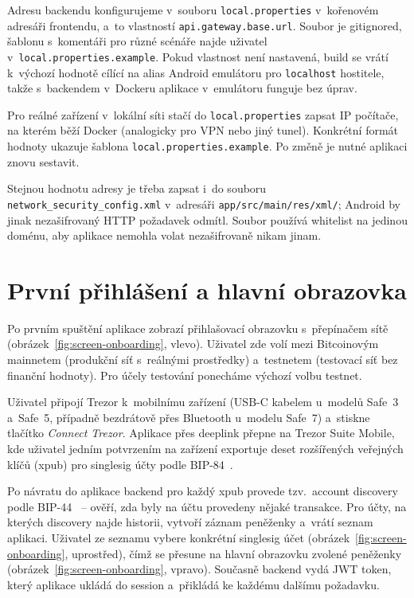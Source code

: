 Adresu backendu konfigurujeme v~souboru \texttt{local.properties}
v~kořenovém adresáři frontendu, a~to vlastností
\texttt{api.\allowbreak gateway.\allowbreak base.\allowbreak url}. Soubor je
gitignored, šablonu s~komentáři pro různé scénáře najde uživatel
v~\texttt{local.\allowbreak properties.\allowbreak example}. Pokud vlastnost
není nastavená, build se vrátí k~výchozí hodnotě cílící na alias
Android emulátoru pro \texttt{localhost} hostitele, takže s~backendem
v~Dockeru aplikace v~emulátoru funguje bez úprav.

Pro reálné zařízení v~lokální síti stačí do \texttt{local.properties}
zapsat IP počítače, na kterém běží Docker (analogicky pro VPN nebo
jiný tunel). Konkrétní formát hodnoty ukazuje šablona
\texttt{local.\allowbreak properties.\allowbreak example}. Po změně
je nutné aplikaci znovu sestavit.

Stejnou hodnotu adresy je třeba zapsat i~do souboru
\texttt{network\_\allowbreak security\_\allowbreak config.\allowbreak xml}
v~adresáři \texttt{app/\allowbreak src/\allowbreak main/\allowbreak res/\allowbreak xml/};
Android by jinak nezašifrovaný HTTP požadavek odmítl. Soubor používá
whitelist na jedinou doménu, aby aplikace nemohla volat nezašifrovaně
nikam jinam.

\section{První přihlášení a hlavní obrazovka}
\label{sec:user-prihlaseni}

Po prvním spuštění aplikace zobrazí přihlašovací obrazovku s~přepínačem
sítě (obrázek~\ref{fig:screen-onboarding}, vlevo). Uživatel zde volí mezi
Bitcoinovým mainnetem (produkční síť s~reálnými prostředky) a~testnetem
(testovací síť bez finanční hodnoty). Pro účely testování ponecháme výchozí
volbu testnet.

Uživatel připojí Trezor k~mobilnímu zařízení (USB-C kabelem u~modelů
Safe~3 a~Safe~5, případně bezdrátově přes Bluetooth u~modelu Safe~7)
a~stiskne tlačítko \emph{Connect Trezor}. Aplikace přes deeplink přepne na Trezor
Suite Mobile, kde uživatel jedním potvrzením na zařízení exportuje deset
rozšířených veřejných klíčů (xpub) pro singlesig účty podle
BIP-84~\cite{BIP84}.

Po návratu do aplikace backend pro každý xpub provede tzv.~account discovery
podle BIP-44~\cite{BIP44} -- ověří, zda byly na účtu provedeny nějaké
transakce. Pro účty, na kterých discovery najde historii, vytvoří záznam
peněženky a~vrátí seznam aplikaci. Uživatel ze
seznamu vybere konkrétní singlesig účet
(obrázek~\ref{fig:screen-onboarding}, uprostřed), čímž se přesune na hlavní
obrazovku zvolené peněženky (obrázek~\ref{fig:screen-onboarding}, vpravo).
Současně backend vydá JWT token, který aplikace ukládá do session
a~přikládá ke každému dalšímu požadavku.


